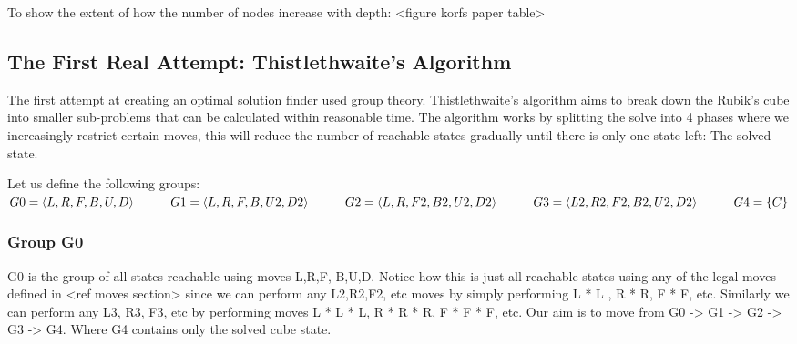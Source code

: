 \documentclass[titlepage]{report}[12pt]
\begin{document}
To show the extent of how the number of nodes increase with depth:
<figure korfs paper table> %
\subsection{The First Real Attempt: Thistlethwaite's Algorithm}
The first attempt at creating an optimal solution finder used group theory. Thistlethwaite's algorithm aims to break down the Rubik's cube into smaller sub-problems that can be calculated within reasonable time. The algorithm works by splitting the solve into 4 phases where we increasingly restrict certain moves, this will reduce the number of reachable states gradually until there is only one state left: The solved state. 

Let us define the following groups:
\\
\indent \indent
\begin{math}
G0 = \langle L,R,F,B,U,D \rangle
\\ \indent \indent
G1 =  \langle L,R,F,B,U2,D2 \rangle
\\ \indent \indent
G2 = \langle L,R,F2,B2,U2,D2 \rangle
\\ \indent \indent
G3 = \langle L2,R2,F2,B2,U2,D2 \rangle
\\ \indent \indent
G4 = \{C\}
\end{math}

\subsubsection{Group G0} G0 is the group of all states reachable using moves L,R,F, B,U,D. Notice how this is just all reachable states using any of the legal moves defined in <ref moves section> since we can perform any L2,R2,F2, etc moves by simply performing L * L , R * R, F * F, etc. Similarly we can perform any L3, R3, F3, etc by performing moves L * L * L, R * R * R, F * F * F, etc. Our aim is to move from G0 -> G1 -> G2 -> G3 -> G4. Where G4 contains only the solved cube state.
\end{document}
